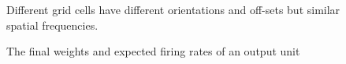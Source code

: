 \documentclass[a4paper, 12pt]{article}
\begin{document}
\begin{figure}
\hfill
{}
\hfill
{}
\hfill
\caption{Different grid cells have different orientations and off-sets but similar spatial frequencies.}
\label{diff}
\end{figure}

\begin{figure}
\hfill
{}
\hfill
{}
\hfill
\caption{The final weights and expected firing rates of an output unit}
\label{diff}
\end{figure}
%
%
%
\end{document}
